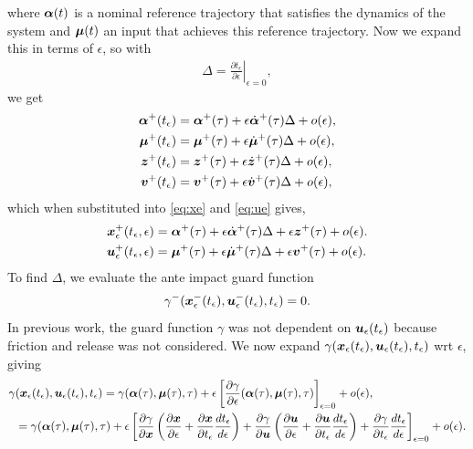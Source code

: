 \documentclass[DC2017114Bouma.tex]{subfiles}
\begin{document}
where $\boldsymbol{\alpha}(t)$ is a nominal reference trajectory that satisfies the dynamics of the system and $\boldsymbol{\mu}(t)$ an input that achieves this reference trajectory. Now we expand this in terms of $\epsilon$, so with
\begin{align}
\Delta = \left.\frac{\partial t_\epsilon}{\partial\epsilon}\right|_{\epsilon=0},
\end{align} 
we get
\begin{align}
\boldsymbol{\alpha}^{+}(t_\epsilon) &= \boldsymbol{\alpha}^{+}(\tau) + \epsilon \dot{\boldsymbol{\alpha}}^{+}(\tau)\Delta + o(\epsilon),\\
\boldsymbol{\mu}^{+}(t_\epsilon) &= \boldsymbol{\mu}^{+}(\tau) + \epsilon \dot{\boldsymbol{\mu}}^{+}(\tau)\Delta + o(\epsilon),\\
{\boldsymbol{z}}^{+}(t_\epsilon) &= {\boldsymbol{z}}^{+}(\tau) + \epsilon \dot{{\boldsymbol{z}}}^{+}(\tau)\Delta + o(\epsilon),\\
{\boldsymbol{v}}^{+}(t_\epsilon) &= {\boldsymbol{v}}^{+}(\tau) + \epsilon \dot{{\boldsymbol{v}}}^{+}(\tau)\Delta + o(\epsilon),
\end{align}
which when substituted into \eqref{eq:xe} and \eqref{eq:ue} gives,
\begin{align}
{\boldsymbol{x}}^{+}_\epsilon(t_\epsilon,\epsilon) &= \boldsymbol{\alpha}^{+}(\tau) + \epsilon \dot{\boldsymbol{\alpha}}^{+}(\tau)\Delta + \epsilon {\boldsymbol{z}}^{+}(\tau) + o(\epsilon). \label{eq:xeexp}\\
{\boldsymbol{u}}^{+}_\epsilon(t_\epsilon,\epsilon) &= \boldsymbol{\mu}^{+}(\tau) + \epsilon \dot{\boldsymbol{\mu}}^{+}(\tau)\Delta + \epsilon {\boldsymbol{v}}^{+}(\tau) + o(\epsilon). \label{eq:ueexp}
\end{align}
 To find $\Delta$, we evaluate the ante impact guard function
\begin{align}
\gamma^{-}( {\boldsymbol{x}}^{-}_\epsilon(t_\epsilon),{\boldsymbol{u}}^{-}_\epsilon(t_\epsilon),t_\epsilon) = 0.
\end{align}
In previous work, the guard function $\gamma$ was not dependent on ${\boldsymbol{u}}_\epsilon(t_\epsilon)$ because friction and release was not considered. We now expand $\gamma({\boldsymbol{x}}_\epsilon(t_\epsilon),{\boldsymbol{u}}_\epsilon(t_\epsilon),t_\epsilon)$ wrt $\epsilon$, giving
\begin{align}
\gamma&({\boldsymbol{x}}_\epsilon(t_\epsilon),{\boldsymbol{u}}_\epsilon(t_\epsilon),t_\epsilon) = \gamma( \boldsymbol{\alpha}(\tau), \boldsymbol{\mu}(\tau),\tau) + \epsilon\left[\frac{\partial \gamma}{\partial\epsilon}(\boldsymbol{\alpha}(\tau),\boldsymbol{\mu}(\tau),\tau)\right]_{\epsilon=0} + o(\epsilon),\\
&= \gamma( \boldsymbol{\alpha}(\tau), \boldsymbol{\mu}(\tau),\tau) + \epsilon\left[ \frac{\partial\gamma}{\partial{\boldsymbol{x}}}\left(\frac{\partial{\boldsymbol{x}}}{\partial\epsilon} + \frac{\partial{\boldsymbol{x}}}{\partial t_\epsilon}\frac{d t_\epsilon}{d\epsilon}\right) + \frac{\partial\gamma}{\partial{\boldsymbol{u}}}\left(\frac{\partial{\boldsymbol{u}}}{\partial\epsilon} + \frac{\partial{\boldsymbol{u}}}{\partial t_\epsilon}\frac{d t_\epsilon}{d\epsilon}\right) + \frac{\partial\gamma}{\partial t_\epsilon}\frac{d t_\epsilon}{d\epsilon}  \right]_{\epsilon=0} + o(\epsilon). \label{eq:gamma}
\end{align}
\end{document}
